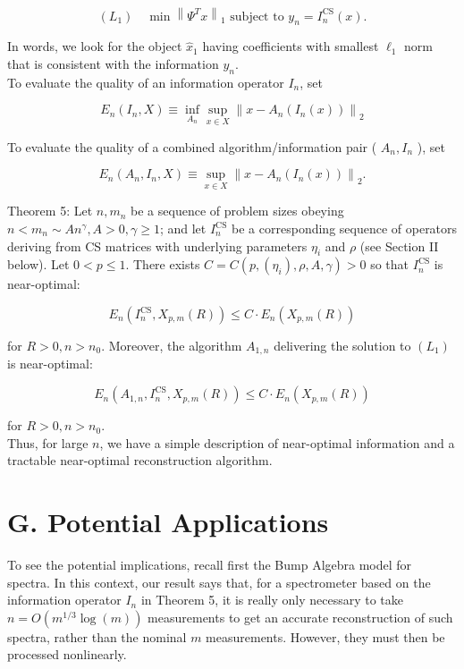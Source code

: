 \documentclass[10pt]{article}
\begin{document}
$$
\left(L_{1}\right) \quad \min \left\|\Psi^{T} x\right\|_{1} \text { subject to } y_{n}=I_{n}^{\mathrm{CS}}(x) .
$$

In words, we look for the object $\hat{x}_{1}$ having coefficients with smallest $\ell_{1}$ norm that is consistent with the information $y_{n}$.\\
To evaluate the quality of an information operator $I_{n}$, set

$$
E_{n}\left(I_{n}, X\right) \equiv \inf _{A_{n}} \sup _{x \in X}\left\|x-A_{n}\left(I_{n}(x)\right)\right\|_{2}
$$

To evaluate the quality of a combined algorithm/information pair ( $A_{n}, I_{n}$ ), set

$$
E_{n}\left(A_{n}, I_{n}, X\right) \equiv \sup _{x \in X}\left\|x-A_{n}\left(I_{n}(x)\right)\right\|_{2} .
$$

Theorem 5: Let $n, m_{n}$ be a sequence of problem sizes obeying $n<m_{n} \sim A n^{\gamma}, A>0, \gamma \geq 1$; and let $I_{n}^{\mathrm{CS}}$ be a corresponding sequence of operators deriving from CS matrices with underlying parameters $\eta_{i}$ and $\rho$ (see Section II below). Let $0<p \leq 1$. There exists $C=C\left(p,\left(\eta_{i}\right), \rho, A, \gamma\right)>0$ so that $I_{n}^{\mathrm{CS}}$ is near-optimal:

$$
E_{n}\left(I_{n}^{\mathrm{CS}}, X_{p, m}(R)\right) \leq C \cdot E_{n}\left(X_{p, m}(R)\right)
$$

for $R>0, n>n_{0}$. Moreover, the algorithm $A_{1, n}$ delivering the solution to $\left(L_{1}\right)$ is near-optimal:

$$
E_{n}\left(A_{1, n}, I_{n}^{\mathrm{CS}}, X_{p, m}(R)\right) \leq C \cdot E_{n}\left(X_{p, m}(R)\right)
$$

for $R>0, n>n_{0}$.\\
Thus, for large $n$, we have a simple description of near-optimal information and a tractable near-optimal reconstruction algorithm.

\section*{G. Potential Applications}
To see the potential implications, recall first the Bump Algebra model for spectra. In this context, our result says that, for a spectrometer based on the information operator $I_{n}$ in Theorem 5, it is really only necessary to take $n=O\left(m^{1 / 3} \log (m)\right)$ measurements to get an accurate reconstruction of such spectra, rather than the nominal $m$ measurements. However, they must then be processed nonlinearly.
\end{document}
